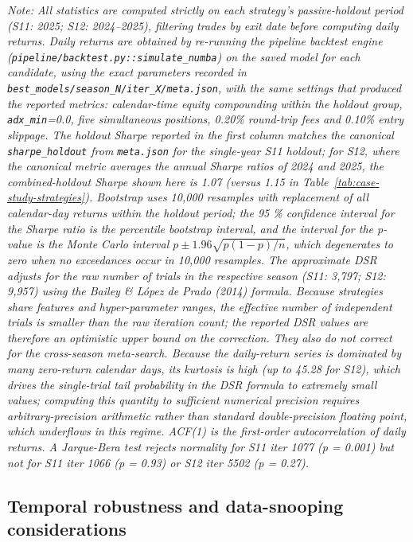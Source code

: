 \documentclass[analytics,article,submit,pdftex,moreauthors]{Definitions/mdpi}
\begin{document}
\emph{Note: All statistics are computed strictly on each strategy's passive-holdout period (S11: 2025; S12: 2024--2025), filtering trades by exit date before computing daily returns. Daily returns are obtained by re-running the pipeline backtest engine (\texttt{pipeline/backtest.py::simulate\_numba}) on the saved model for each candidate, using the exact parameters recorded in \texttt{best\_models/season\_N/iter\_X/meta.json}, with the same settings that produced the reported metrics: calendar-time equity compounding within the holdout group, \texttt{adx\_min}=0.0, five simultaneous positions, 0.20\% round-trip fees and 0.10\% entry slippage. The holdout Sharpe reported in the first column matches the canonical \texttt{sharpe\_holdout} from \texttt{meta.json} for the single-year S11 holdout; for S12, where the canonical metric averages the annual Sharpe ratios of 2024 and 2025, the combined-holdout Sharpe shown here is 1.07 (versus 1.15 in Table~\ref{tab:case-study-strategies}). Bootstrap uses 10,000 resamples with replacement of all calendar-day returns within the holdout period; the 95 \% confidence interval for the Sharpe ratio is the percentile bootstrap interval, and the interval for the p-value is the Monte Carlo interval \(p \pm 1.96\sqrt{p(1-p)/n}\), which degenerates to zero when no exceedances occur in 10,000 resamples. The approximate DSR adjusts for the raw number of trials in the respective season (S11: 3,797; S12: 9,957) using the Bailey \& López de Prado (2014) formula. Because strategies share features and hyper-parameter ranges, the effective number of independent trials is smaller than the raw iteration count; the reported DSR values are therefore an optimistic upper bound on the correction. They also do not correct for the cross-season meta-search. Because the daily-return series is dominated by many zero-return calendar days, its kurtosis is high (up to 45.28 for S12), which drives the single-trial tail probability in the DSR formula to extremely small values; computing this quantity to sufficient numerical precision requires arbitrary-precision arithmetic rather than standard double-precision floating point, which underflows in this regime. ACF(1) is the first-order autocorrelation of daily returns. A Jarque-Bera test rejects normality for S11 iter 1077 (p = 0.001) but not for S11 iter 1066 (p = 0.93) or S12 iter 5502 (p = 0.27).}

\subsection{Temporal robustness and data-snooping considerations}\label{temporal-robustness-and-data-snooping-considerations}
\end{document}
